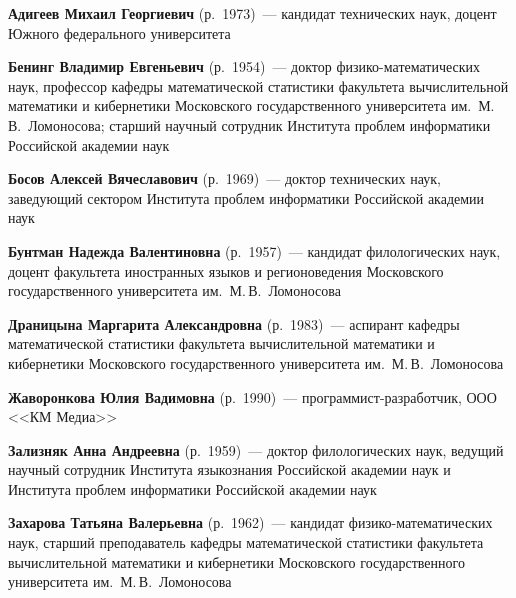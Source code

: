 \begin{multicols}{2}

\noindent
\textbf{Адигеев Михаил Георгиевич} (р.\ 1973)~---
кандидат технических наук, доцент Южного федерального университета

\vspace*{2pt}

\noindent
\textbf{Бенинг Владимир Евгеньевич} (р.\ 1954)~---
доктор фи\-зи\-ко-ма\-те\-ма\-ти\-че\-ских
наук, профессор кафедры математи\-ческой статистики факультета вычислительной
математики и кибернетики Московского государственного университета им.\ М.\,В.~Ломоносова;
старший научный сотрудник Института проб\-лем информатики Российской академии наук

\vspace*{2pt}

\noindent
\textbf{Босов Алексей Вячеславович} (р.\ 1969)~---
доктор технических наук, заведующий сектором Института проблем информатики
Российской академии наук

\vspace*{2pt}

\noindent
\textbf{Бунтман Надежда Валентиновна} (р.\ 1957)~---
кандидат филологических наук, доцент факультета иностранных языков и регионоведения
Московского государственного университета им.\ М.\,В.~Ломоносова

\vspace*{2pt}

\noindent
\textbf{Драницына Маргарита Александровна} (р.\ 1983)~---
аспирант кафедры математической статистики факультета вычислительной математики
и кибернетики Московского государственного университета им.\ М.\,В.~Ломоносова

\vspace*{2pt}

\noindent
\textbf{Жаворонкова Юлия Вадимовна} (р.\ 1990)~---
про\-грам\-мист-раз\-ра\-бот\-чик, ООО <<КМ Медиа>>

\vspace*{2pt}

\noindent
\textbf{Зализняк Анна Андреевна} (р.\ 1959)~---
доктор филологических наук, ведущий научный сотрудник Института языкознания
Российской академии наук и Института проблем информатики Российской академии
наук

\vspace*{2pt}

\noindent
\textbf{Захарова Татьяна Валерьевна} (р.\ 1962)~---
кандидат фи\-зи\-ко-ма\-те\-ма\-ти\-че\-ских наук, старший преподаватель
кафедры математической статистики факультета вычислительной математики и
кибернетики Московского государственного университета им.\ М.\,В.~Ломоносова


\end{multicols}
